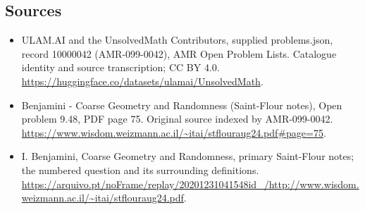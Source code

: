 \documentclass[11pt,a4paper]{article}
\begin{document}
\subsection{Sources}
\begin{itemize}
\item[S1] ULAM.AI and the UnsolvedMath Contributors, supplied problems.json, record 10000042 (AMR-099-0042), AMR Open Problem Lists. Catalogue identity and source transcription; CC BY 4.0.
\url{https://huggingface.co/datasets/ulamai/UnsolvedMath}.
\item[S2] Benjamini - Coarse Geometry and Randomness (Saint-Flour notes), Open problem 9.48, PDF page 75. Original source indexed by AMR-099-0042.
\url{https://www.wisdom.weizmann.ac.il/~itai/stflouraug24.pdf#page=75}.
\item[S3] I. Benjamini, Coarse Geometry and Randomness, primary Saint-Flour notes; the numbered question and its surrounding definitions.
\url{https://arquivo.pt/noFrame/replay/20201231041548id_/http://www.wisdom.weizmann.ac.il/~itai/stflouraug24.pdf}.
\end{itemize}
\end{document}
